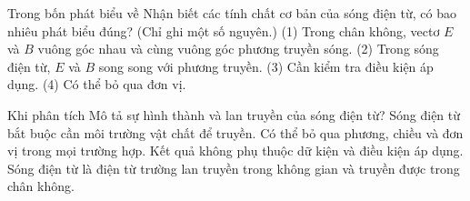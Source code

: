 \begin{ex}
Trong bốn phát biểu về Nhận biết các tính chất cơ bản của sóng điện từ, có bao nhiêu phát biểu đúng? (Chỉ ghi một số nguyên.) (1) Trong chân không, vectơ $E$ và $B$ vuông góc nhau và cùng vuông góc phương truyền sóng. (2) Trong sóng điện từ, $E$ và $B$ song song với phương truyền. (3) Cần kiểm tra điều kiện áp dụng. (4) Có thể bỏ qua đơn vị.
\end{ex}

\begin{ex}
Khi phân tích Mô tả sự hình thành và lan truyền của sóng điện từ?
\choice
{Sóng điện từ bắt buộc cần môi trường vật chất để truyền.}
{Có thể bỏ qua phương, chiều và đơn vị trong mọi trường hợp.}
{Kết quả không phụ thuộc dữ kiện và điều kiện áp dụng.}
{\True Sóng điện từ là điện từ trường lan truyền trong không gian và truyền được trong chân không.}
\end{ex}

